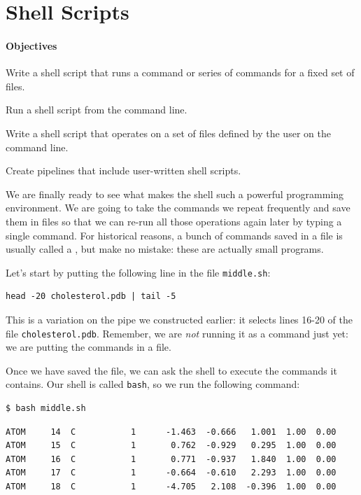 \documentclass{book}
\begin{document}
\section{Shell Scripts}

\mbox{}\paragraph{Objectives}

\begin{swcitemize}
\item
  Write a shell script that runs a command or series of commands for a
  fixed set of files.
\item
  Run a shell script from the command line.
\item
  Write a shell script that operates on a set of files defined by the
  user on the command line.
\item
  Create pipelines that include user-written shell scripts.
\end{swcitemize}

We are finally ready to see what makes the shell such a powerful
programming environment. We are going to take the commands we repeat
frequently and save them in files so that we can re-run all those
operations again later by typing a single command. For historical
reasons, a bunch of commands saved in a file is usually called a
, but make no mistake: these are
actually small programs.

Let's start by putting the following line in the file
\texttt{middle.sh}:

\begin{verbatim}
head -20 cholesterol.pdb | tail -5
\end{verbatim}

This is a variation on the pipe we constructed earlier: it selects lines
16-20 of the file \texttt{cholesterol.pdb}. Remember, we are \emph{not}
running it as a command just yet: we are putting the commands in a file.

Once we have saved the file, we can ask the shell to execute the
commands it contains. Our shell is called \texttt{bash}, so we run the
following command:

\begin{verbatim}
$ bash middle.sh
\end{verbatim}

\begin{verbatim}
ATOM     14  C           1      -1.463  -0.666   1.001  1.00  0.00
ATOM     15  C           1       0.762  -0.929   0.295  1.00  0.00
ATOM     16  C           1       0.771  -0.937   1.840  1.00  0.00
ATOM     17  C           1      -0.664  -0.610   2.293  1.00  0.00
ATOM     18  C           1      -4.705   2.108  -0.396  1.00  0.00
\end{verbatim}
\end{document}
